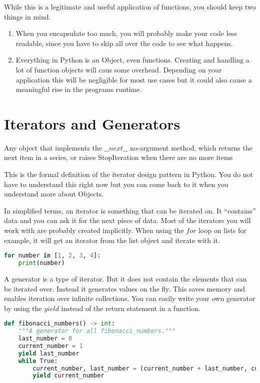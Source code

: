 \documentclass{article}
\newcommand{\qq}[1]{``#1''}
\begin{document}
While this is a legitimate and useful application of functions, you should keep
two things in mind.

\begin{enumerate}
    \item When you encapsulate too much, you will probably make your code less readable, since you have to skip all over the code to see what happens.
    \item Everything in Python is an Object, even functions.
          Creating and handling a lot of function objects will caus some overhead.
          Depending on your application this will be negligible for most use cases but it could also cause a meaningful rise in the programs runtime.
\end{enumerate}

\section{Iterators and Generators }\label{generators}

\epigraph{Any object that implements the $\_\_next\_\_$ no-argument method,
    which returns the next item in a series, or raises StopIteration
    when there are no more items}{\cite{Ram2015}}

This is the formal definition of the iterator design pattern in Python.
You do not have to understand this right now but you can come back to it when
you understand more about Objects.


In simplified terms, an iterator is something that can be iterated on.
It \qq{contains} data and you can ask it for the next piece of data.
Most of the iterators you will work with are probably created implicitly.
When using the $for$ loop on lists for example, it will get an iterator from the
list object and iterate with it.

\begin{lstlisting}[language=Python]
for number in [1, 2, 3, 4]:
    print(number)
\end{lstlisting}

A generator is a type of iterator.
But it does not contain the elements that can be iterated over.
Instead it generates values on the fly.
This saves memory and enables iteration over infinite collections.
You can easily write your own generator by using the $yield$ instead of the
return statement in a function.

\begin{lstlisting}[language=Python]
def fibonacci_numbers() -> int:
    """A generator for all fibonacci_numbers."""
    last_number = 0
    current_number = 1
    yield last_number
    while True:
        current_number, last_number = (current_number + last_number, current_number)
        yield current_number
\end{lstlisting}
\end{document}
